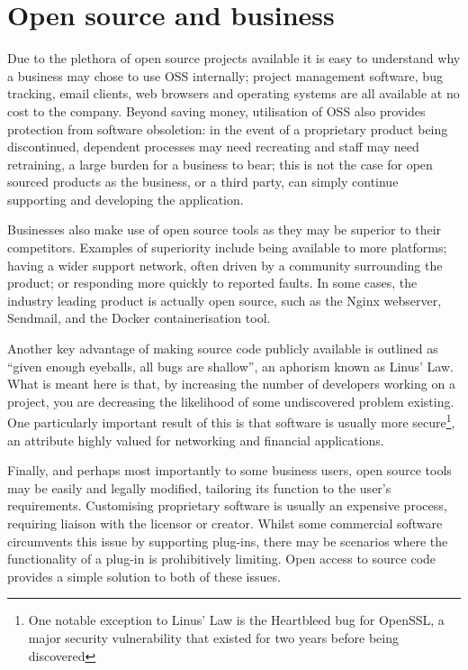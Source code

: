 \documentclass[a4paper]{article}
\begin{document}
\section{Open source and business}

Due to the plethora of open source projects available it is easy to understand why a business may chose to use OSS internally; project management software, bug tracking, email clients, web browsers and operating systems are all available at no cost to the company. Beyond saving money, utilisation of OSS also provides protection from software obsoletion: in the event of a proprietary product being discontinued, dependent processes may need recreating and staff may need retraining, a large burden for a business to bear; this is not the case for open sourced products as the business, or a third party, can simply continue supporting and developing the application.

Businesses also make use of open source tools as they may be superior to their competitors. Examples of superiority include being available to more platforms; having a wider support network, often driven by a community surrounding the product; or responding more quickly to reported faults\cite{cio}. In some cases, the industry leading product is actually open source, such as the Nginx webserver\cite{nginx}, Sendmail\cite{sendmail}, and the Docker containerisation tool\cite{docker}.

Another key advantage of making source code publicly available is outlined as “given enough eyeballs, all bugs are shallow”, an aphorism known as Linus’ Law\cite{catb}. What is meant here is that, by increasing the number of developers working on a project, you are decreasing the likelihood of some undiscovered problem existing. One particularly important result of this is that software is usually more secure\footnote{One notable exception to Linus’ Law is the Heartbleed bug for OpenSSL, a major security vulnerability that existed for two years before being discovered\cite{heartbleed}}, an attribute highly valued for networking and financial applications\cite{secureoss}.

Finally, and perhaps most importantly to some business users, open source tools may be easily and legally modified, tailoring its function to the user’s requirements. Customising proprietary software is usually an expensive process, requiring liaison with the licensor or creator. Whilst some commercial software circumvents this issue by supporting plug-ins, there may be scenarios where the functionality of a plug-in is prohibitively limiting. Open access to source code provides a simple solution to both of these issues.
\end{document}
